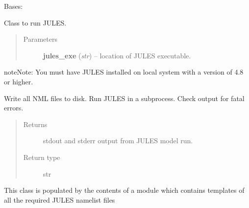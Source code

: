 \documentclass[letterpaper,10pt,english]{sphinxmanual}
\begin{document}
\begin{fulllineitems}
\label{source/sentinelSimulator.jules:sentinelSimulator.jules.py_jules.jules}
Bases: {\hyperref[source/sentinelSimulator.jules:sentinelSimulator.jules.py_jules.julesAllNML]{}}

Class to run JULES.
\begin{quote}\begin{description}
\item[{Parameters}] \leavevmode
\textbf{jules\_exe} (\emph{str}) -- location of JULES executable.

\end{description}\end{quote}

\begin{notice}{note}{Note:}
You must have JULES installed on local system with a version of 4.8 or higher.
\end{notice}

\begin{fulllineitems}
\label{source/sentinelSimulator.jules:sentinelSimulator.jules.py_jules.jules.runJules}
Write all NML files to disk.
Run JULES in a subprocess.
Check output for fatal errors.
\begin{quote}\begin{description}
\item[{Returns}] \leavevmode
stdout and stderr output from JULES model run.

\item[{Return type}] \leavevmode
str

\end{description}\end{quote}

\end{fulllineitems}


\end{fulllineitems}


\begin{fulllineitems}
\label{source/sentinelSimulator.jules:sentinelSimulator.jules.py_jules.julesAllNML}
This class is populated by the contents
of a module which contains templates
of all the required JULES namelist files

\begin{fulllineitems}
\label{source/sentinelSimulator.jules:sentinelSimulator.jules.py_jules.julesAllNML.writeNML}
\end{fulllineitems}


\end{fulllineitems}
\end{document}
